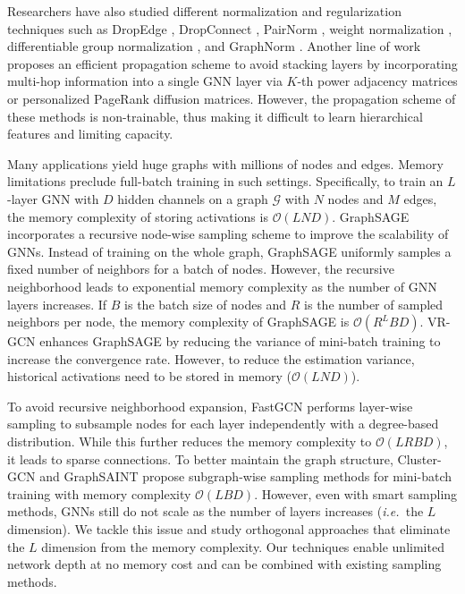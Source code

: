 \documentclass{article}
\newcommand{\ie}{\emph{i.e.~}}
\begin{document}
Researchers have also studied different normalization and regularization techniques such as DropEdge \citep{rong2020dropedge}, DropConnect \citep{hasanzadeh2020bayesian}, PairNorm \citep{zhao2019pairnorm}, weight normalization \citep{oono2019graph}, differentiable group normalization \citep{zhou2020towards}, and GraphNorm \citep{cai2020graphnorm}. Another line of work \citep{wu2019simplifying,klicpera_predict_2019,bojchevski2020scaling,liu2020towards,sign_icml_grl2020} proposes an efficient propagation scheme to avoid stacking layers by incorporating multi-hop information into a single GNN layer via $K$-th power adjacency matrices or personalized PageRank diffusion matrices. However, the propagation scheme of these methods is non-trainable, thus making it difficult to learn hierarchical features and  limiting capacity.

Many applications yield huge graphs with millions of nodes and edges. Memory limitations preclude full-batch training in such settings. Specifically, to train an $L$-layer GNN with $D$ hidden channels on a graph $\mathcal{G}$ with $N$ nodes and $M$ edges, the memory complexity of storing activations is $\mathcal{O}(LND)$. GraphSAGE \citep{hamilton2017inductive} incorporates a recursive node-wise sampling scheme to improve the scalability of GNNs. Instead of training on the whole graph, GraphSAGE uniformly samples a fixed number of neighbors for a batch of nodes. However, the recursive neighborhood leads to exponential memory complexity as the number of GNN layers increases. If $B$ is the batch size of nodes and $R$ is the number of sampled neighbors per node, the memory complexity of GraphSAGE is $\mathcal{O}(R^{L}BD)$. VR-GCN \citep{chen2018stochastic} enhances GraphSAGE by reducing the variance of mini-batch training to increase the convergence rate. However, to reduce the estimation variance, historical activations need to be stored in memory ($\mathcal{O}(LND)$). 

To avoid recursive neighborhood expansion, FastGCN \citep{chen2018fastgcn} performs layer-wise sampling to subsample nodes for each layer independently with a degree-based distribution. While this further reduces the memory complexity to $\mathcal{O}(LRBD)$, it leads to sparse connections.
To better maintain the graph structure, Cluster-GCN \citep{chiang2019cluster} and GraphSAINT \citep{graphsaint-iclr20} propose subgraph-wise sampling methods for mini-batch training with memory complexity $\mathcal{O}(LBD)$. However, even with smart sampling methods, GNNs still do not scale as the number of layers increases (\ie the $L$ dimension). We tackle this issue and study orthogonal approaches that eliminate the $L$ dimension from the memory complexity. Our techniques enable unlimited network depth at no memory cost and can be combined with existing sampling methods.
\end{document}
